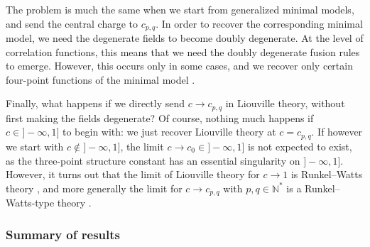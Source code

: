 \documentclass[12pt, a4paper, notitlepage, twoside]{report}
\numberwithin{equation}{section}
\theoremstyle{break}
\begin{document}
The problem is much the same when we start from generalized minimal models, and send the central charge to $c_{p, q}$. In order to recover the corresponding minimal model, we need the degenerate fields to become doubly degenerate. At the level of correlation functions, this means that we need the doubly degenerate fusion rules to emerge. However, this occurs only in some cases, and we recover only certain four-point functions of the minimal model \cite{rib18}. 

Finally, what happens if we directly send $c\to c_{p, q}$ in Liouville theory, without first making the fields degenerate? Of course, nothing much happens if $c\in ]-\infty, 1]$ to begin with: we just recover Liouville theory at $c=c_{p, q}$. If however we start with $c\notin ]-\infty, 1]$, the limit $c\to c_0\in ]-\infty, 1]$ is not expected to exist, as the three-point structure constant has an essential singularity on $]-\infty, 1]$. However, it turns out that the limit of Liouville theory for $c\to 1$ is Runkel--Watts theory \cite{sch03}, and more generally the limit for $c\to c_{p,q}$ with $p,q\in\mathbb{N}^*$ is a Runkel--Watts-type theory \cite{mce07}. 



\subsubsection{Summary of results}
\end{document}
